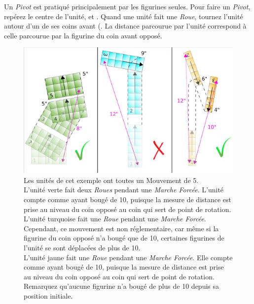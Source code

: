 Un \emph{Pivot} est pratiqué principalement par les figurines seules. Pour faire un \emph{Pivot}, repérez le centre de l'unité, et . 
Quand une unité fait une \emph{Roue}, tournez l'unité autour d'un de ses coins avant (. La distance parcourue par l'unité correspond à celle parcourue par la figurine du coin avant opposé. 

\begin{figure}[!htbp]
\centering
\includegraphics[width=15.5cm]{roue.png}
\caption{Les unités de cet exemple ont toutes un Mouvement de 5. \\
L'unité verte fait deux \emph{Roues} pendant une \emph{Marche Forcée}. L'unité compte comme ayant bougé de 10{\pouce}, puisque la mesure de distance est prise au niveau du coin opposé au coin qui sert de point de rotation. \\
L'unité turquoise fait une \emph{Roue} pendant une \emph{Marche Forcée}. Cependant, ce mouvement est non réglementaire, car même si la figurine du coin opposé n'a bougé que de 10{\pouce}, certaines figurines de l'unité se sont déplacées de plus de 10{\pouce}. \\
L'unité jaune fait une \emph{Roue} pendant une \emph{Marche Forcée}. Elle compte comme ayant bougé de 10{\pouce}, puisque la mesure de distance est prise au niveau du coin opposé au coin qui sert de point de rotation. Remarquez qu'aucune figurine n'a bougé de plus de 10{\pouce} depuis sa position initiale.}
\label{figure/roue}
\end{figure}
